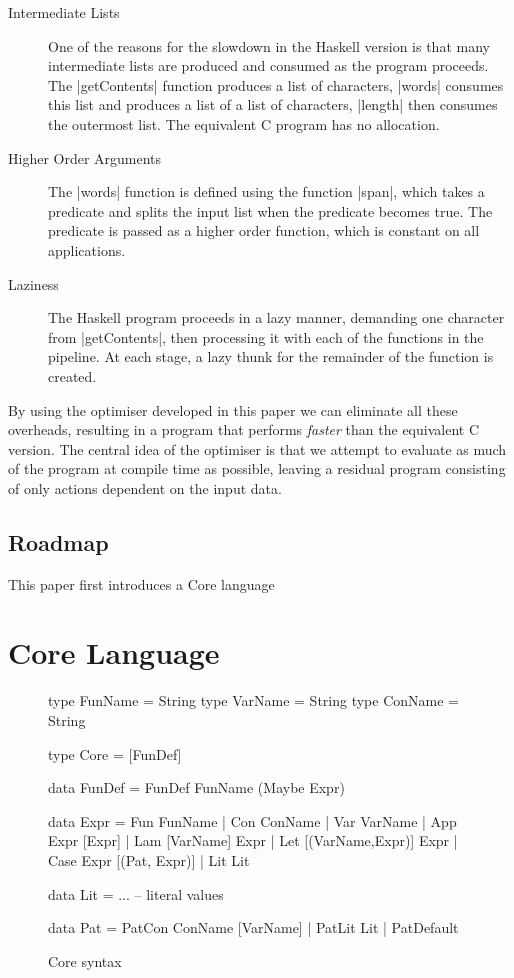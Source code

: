 \documentclass{llncs}
\begin{document}
\begin{description}
\item[Intermediate Lists] One of the reasons for the slowdown in the Haskell version is that many intermediate lists are produced and consumed as the program proceeds. The |getContents| function produces a list of characters, |words| consumes this list and produces a list of a list of characters, |length| then consumes the outermost list. The equivalent C program has no allocation.
\item[Higher Order Arguments] The |words| function is defined using the function |span|, which takes a predicate and splits the input list when the predicate becomes true. The predicate is passed as a higher order function, which is constant on all applications.
\item[Laziness] The Haskell program proceeds in a lazy manner, demanding one character from |getContents|, then processing it with each of the functions in the pipeline. At each stage, a lazy thunk for the remainder of the function is created.
\end{description}

By using the optimiser developed in this paper we can eliminate all these overheads, resulting in a program that performs \textit{faster} than the equivalent C version. The central idea of the optimiser is that we attempt to evaluate as much of the program at compile time as possible, leaving a residual program consisting of only actions dependent on the input data.

\subsection{Roadmap}

This paper first introduces a Core language

\section{Core Language}

\begin{figure}
\begin{code}
type FunName  = String
type VarName  = String
type ConName  = String

type Core = [FunDef]

data FunDef  =  FunDef FunName (Maybe Expr)

data Expr  =  Fun   FunName
           |  Con   ConName
           |  Var   VarName
           |  App   Expr [Expr]
           |  Lam   [VarName] Expr
           |  Let   [(VarName,Expr)] Expr
           |  Case  Expr [(Pat, Expr)]
           |  Lit   Lit

data Lit = ... -- literal values

data Pat = PatCon  ConName [VarName]
         | PatLit  Lit
         | PatDefault
\end{code}
\caption{Core syntax}
\label{fig:core}
\end{figure}
\end{document}
